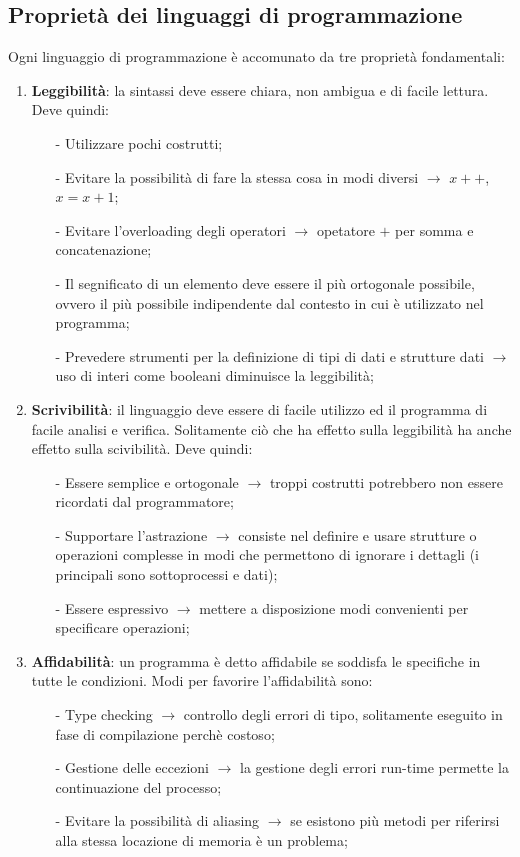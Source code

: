 \documentclass[a4paper, 10pt]{report}
\begin{document}
\subsection*{Proprietà dei linguaggi di programmazione}
\noindent Ogni linguaggio di programmazione è accomunato da tre proprietà fondamentali:
\begin{enumerate}
\item \textbf{Leggibilità}: la sintassi deve essere chiara, non ambigua e di facile lettura. Deve quindi:
	\begin{itemize}
	\item[-] Utilizzare pochi costrutti;
	\item[-] Evitare la possibilità di fare la stessa cosa in modi diversi $\rightarrow$ $x++$, $x = x + 1$;
	\item[-] Evitare l'overloading degli operatori $\rightarrow$ opetatore $+$ per somma e concatenazione;
	\item[-] Il segnificato di un elemento deve essere il più ortogonale possibile, ovvero il più possibile indipendente dal contesto in cui è utilizzato nel programma;
	\item[-] Prevedere strumenti per la definizione di tipi di dati e  strutture  dati $\rightarrow$ uso di interi come booleani diminuisce la leggibilità;
	\end{itemize}
\item \textbf{Scrivibilità}: il linguaggio deve essere di facile utilizzo ed il programma di facile analisi e verifica. Solitamente ciò che ha effetto sulla leggibilità ha anche effetto sulla scivibilità. Deve quindi:
	\begin{itemize}
	\item[-] Essere semplice e ortogonale $\rightarrow$ troppi costrutti potrebbero non essere ricordati dal programmatore;
	\item[-] Supportare l'astrazione $\rightarrow$ consiste nel definire  e  usare strutture   o   operazioni   complesse   in   modi   che permettono  di  ignorare  i  dettagli (i principali sono sottoprocessi e dati); 
	\item[-] Essere espressivo $\rightarrow$ mettere a disposizione modi convenienti  per  specificare  operazioni;
	\end{itemize}
\item \textbf{Affidabilità}: un programma è detto affidabile se soddisfa le specifiche in tutte le condizioni. Modi per favorire l'affidabilità sono:
	\begin{itemize}
	\item[-] Type checking $\rightarrow$ controllo degli errori di tipo, solitamente eseguito in fase di compilazione perchè costoso;
	\item[-] Gestione delle eccezioni $\rightarrow$ la gestione degli errori run-time permette la continuazione del processo;
	\item[-] Evitare la possibilità di aliasing $\rightarrow$ se esistono più metodi per riferirsi alla stessa locazione di memoria è un problema; 
	\end{itemize}
\end{enumerate}
\end{document}
